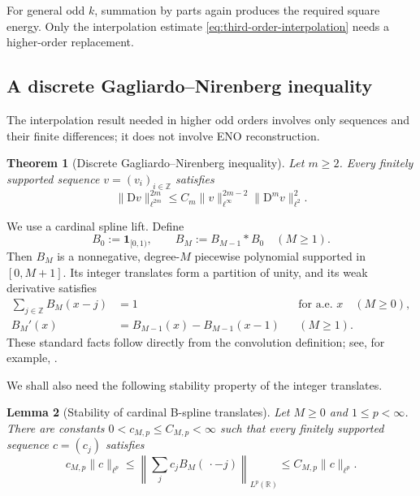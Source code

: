 \documentclass[11pt]{amsart}
\theoremstyle{plain}
\newtheorem{theorem}{Theorem}[section]
\newtheorem{lemma}[theorem]{Lemma}
\theoremstyle{definition}
\theoremstyle{remark}
\numberwithin{equation}{section}
\theoremstyle{plain}
\begin{document}
For general odd $k$, summation by parts again produces the required square
energy.  Only the interpolation estimate
\eqref{eq:third-order-interpolation} needs a higher-order replacement.

\subsection{A discrete Gagliardo--Nirenberg inequality}
\label{sec:discrete-gagliardo}

The interpolation result needed in higher odd orders involves only
sequences and their finite differences; it does not involve ENO
reconstruction.

\begin{theorem}[Discrete Gagliardo--Nirenberg inequality]
	\label{thm:discrete-GN}
	Let $m\ge2$.  Every finitely supported sequence $v=(v_i)_{i\in\mathbb Z}$
	satisfies
	\begin{equation}\label{eq:discrete-GN}
		\|\mathrm Dv\|_{\ell^{2m}}^{2m}
		\le C_m\|v\|_{\ell^\infty}^{2m-2}
		\|\mathrm D^mv\|_{\ell^2}^{2}.
	\end{equation}
\end{theorem}

We use a cardinal spline lift.  Define
\begin{equation}\label{eq:cardinal-bspline-definition}
	B_0:=\mathbf 1_{[0,1)},
	\qquad
	B_M:=B_{M-1}*B_0
	\quad(M\ge1).
\end{equation}
Then $B_M$ is a nonnegative, degree-$M$ piecewise polynomial supported in
$[0,M+1]$.  Its integer translates form a partition of unity, and its weak
derivative satisfies
\begin{equation}\label{eq:bspline-properties}
	\begin{aligned}
		\sum_{j\in\mathbb Z}B_M(x-j)&=1
		&&\text{for a.e. }x\quad(M\ge0),\\
		B_M'(x)&=B_{M-1}(x)-B_{M-1}(x-1)
		&&(M\ge1).
	\end{aligned}
\end{equation}
These standard facts follow directly from the convolution definition; see,
for example, \cite{Schumaker}.

We shall also need the following stability property of the integer
translates.

\begin{lemma}[Stability of cardinal B-spline translates]
	\label{lem:bspline-stability}
	Let $M\ge0$ and $1\le p<\infty$.  There are constants
	$0<c_{M,p}\le C_{M,p}<\infty$ such that every finitely supported sequence
	$c=(c_j)$ satisfies
	\begin{equation}\label{eq:bspline-stability}
		c_{M,p}\|c\|_{\ell^p}
		\le
		\left\|\sum_jc_jB_M(\,\cdot-j)\right\|_{L^p(\mathbb R)}
		\le C_{M,p}\|c\|_{\ell^p}.
	\end{equation}
\end{lemma}
\end{document}
